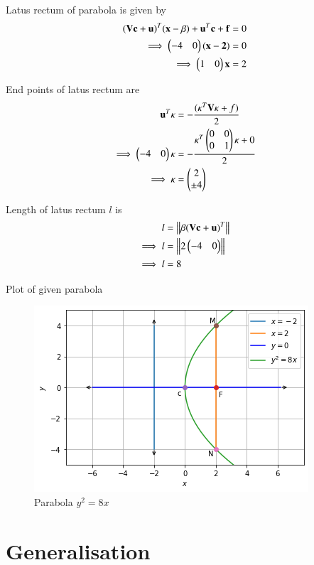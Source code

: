 \documentclass[journal,12pt,twocolumn]{IEEEtran}
\begin{document}
Latus rectum of parabola is given by
\begin{align}
(\mathbf{V}\mathbf{c}+\mathbf{u})^T(\mathbf{x} -\beta) + \mathbf{u}^T\mathbf{c} + \mathbf{f} &= 0
\\
\implies \begin{pmatrix}-4 & 0\end{pmatrix}(\mathbf{x-2}) &= 0
\\
\implies \begin{pmatrix}1 & 0\end{pmatrix}\mathbf{x} &=2
\end{align}

End points of latus rectum are
\begin{align}
\mathbf{u}^T\kappa &= -\frac{(\kappa^T\mathbf{V}\kappa + f )}{2}
\\
\implies \begin{pmatrix}-4 & 0\end{pmatrix}\kappa &= -\frac{\kappa^T\begin{pmatrix}0 & 0\\0 & 1\end{pmatrix}\kappa + 0}{2}
\\
\implies \kappa &= \begin{pmatrix}2 \\ \pm 4\end{pmatrix}
\end{align}

Length of latus rectum $l$ is 
\begin{align}
l &= \left\lVert\beta(\mathbf{V}\mathbf{c}+\mathbf{u})^T\right\rVert
\\
\implies l &= \left\lVert2\begin{pmatrix}-4 & 0\end{pmatrix}\right\rVert
\\
\implies l &= 8 
\end{align}

Plot of given parabola

\begin{figure}[!ht]
\centering
\includegraphics[width=\columnwidth]{Figure6}
\caption{Parabola $y^2=8x$ }
\label{fig:parabola}	
\end{figure}

\clearpage
\section{Generalisation}
\end{document}
